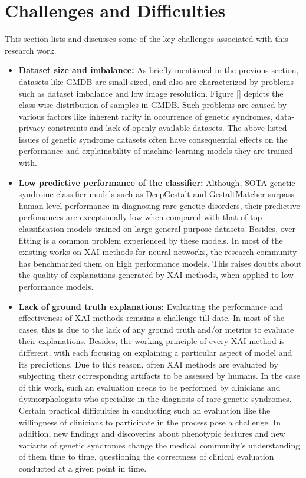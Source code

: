 \documentclass[../report.tex]{subfiles}
\begin{document}
    \section{Challenges and Difficulties} \label{sec_challenges}
    This section lists and discusses some of the key challenges associated with this research work.
	\begin{itemize}
		\item \textbf{Dataset size and imbalance: }As briefly mentioned in the previous section, datasets like GMDB \cite{hsieh2022gestaltmatcher} are small-sized, and also are characterized by problems such as dataset imbalance and low image resolution. Figure \ref{} depicts the class-wise distribution of samples in GMDB. Such problems are caused by various factors like inherent rarity in occurrence of genetic syndromes, data-privacy constraints and lack of openly available datasets. The above listed issues of genetic syndrome datasets often have consequential effects on the performance and explainability of machine learning models they are trained with. 

		\item \textbf{Low predictive performance of the classifier: }Although, SOTA genetic syndrome classifier models such as DeepGestalt \cite{Gurovich2019} and GestaltMatcher \cite{hsieh2022gestaltmatcher} surpass human-level performance in diagnosing rare genetic disorders, their predictive perfomances are exceptionally low when compared with that of top classification models trained on large general purpose datasets. Besides, over-fitting is a common problem experienced by these models. In most of the existing works on XAI methods for neural networks, the research community has benchmarked them on high performance models. This raises doubts about the quality of explanations generated by XAI methods, when applied to low performance models.
	
		\item \textbf{Lack of ground truth explanations: }Evaluating the performance and effectiveness of XAI methods remains a challenge till date. In most of the cases, this is due to the lack of any ground truth and/or metrics to evaluate their explanations. Besides, the working principle of every XAI method is different, with each focusing on explaining a particular aspect of model and its predictions. Due to this reason, often XAI methods are evaluated by subjecting their corresponding artifacts to be assessed by humans. In the case of this work, such an evaluation needs to be performed by clinicians and dysmorphologists who specialize in the diagnosis of rare genetic syndromes. Certain practical difficulties in conducting such an evaluation like the willingness of clinicians to participate in the process pose a challenge. In addition, new findings and discoveries about phenotypic features and new variants of genetic syndromes change the medical community's understanding of them time to time, questioning the correctness of clinical evaluation conducted at a given point in time.
\end{itemize}
   
\end{document}
